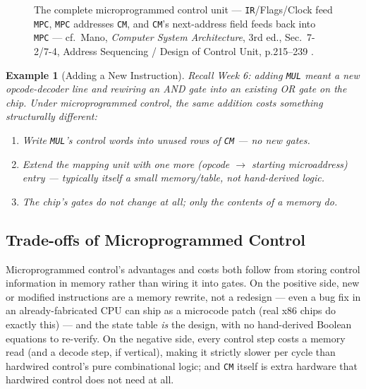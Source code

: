 \documentclass[11pt]{article}
\newtheorem{example}{Example}[section]
\begin{document}
\begin{figure}[h]
  \caption{The complete microprogrammed control unit --- \texttt{IR}/Flags/Clock feed \texttt{MPC}, \texttt{MPC} addresses \texttt{CM}, and \texttt{CM}'s next-address field feeds back into \texttt{MPC} --- cf.\ Mano, \textit{Computer System Architecture}, 3rd ed., Sec.~7-2/7-4, Address Sequencing / Design of Control Unit, p.215--239 \cite{Mano1993_computer_system_architecture,Hamacher2002_computer_organization}.}
  \label{fig:full}
\end{figure}

\begin{example}[Adding a New Instruction]
Recall Week 6: adding \texttt{MUL} meant a new opcode-decoder line \emph{and} rewiring an AND gate into an existing OR gate on the chip. Under microprogrammed control, the same addition costs something structurally different:
\begin{enumerate}
  \item Write \texttt{MUL}'s control words into \emph{unused} rows of \texttt{CM} --- no new gates.
  \item Extend the mapping unit with one more (opcode $\to$ starting microaddress) entry --- typically itself a small memory/table, not hand-derived logic.
  \item The chip's gates do not change at all; only the contents of a memory do.
\end{enumerate}
\end{example}

\subsection{Trade-offs of Microprogrammed Control}

Microprogrammed control's advantages and costs both follow from storing control information in memory rather than wiring it into gates. On the positive side, new or modified instructions are a memory rewrite, not a redesign --- even a bug fix in an already-fabricated CPU can ship as a microcode patch (real x86 chips do exactly this) --- and the state table \emph{is} the design, with no hand-derived Boolean equations to re-verify. On the negative side, every control step costs a memory read (and a decode step, if vertical), making it strictly slower per cycle than hardwired control's pure combinational logic; and \texttt{CM} itself is extra hardware that hardwired control does not need at all.
\end{document}
